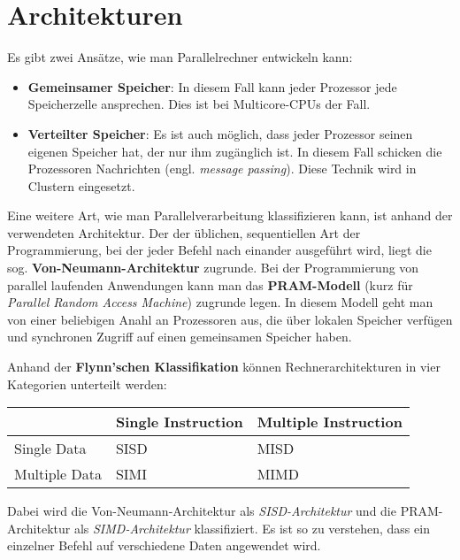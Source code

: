 \section{Architekturen}
Es gibt zwei Ansätze, wie man Parallelrechner entwickeln kann:
\begin{itemize}
    \item \textbf{Gemeinsamer Speicher}: In diesem Fall kann jeder Prozessor 
          jede Speicherzelle ansprechen. Dies ist bei Multicore-CPUs der Fall.
    \item \textbf{Verteilter Speicher}: Es ist auch möglich, dass jeder Prozessor
          seinen eigenen Speicher hat, der nur ihm zugänglich ist. In diesem Fall
          schicken die Prozessoren Nachrichten (engl. \textit{message passing}). Diese Technik wird in Clustern eingesetzt.
\end{itemize}

Eine weitere Art, wie man Parallelverarbeitung klassifizieren kann, ist anhand 
der verwendeten Architektur. Der der üblichen, sequentiellen Art der Programmierung,
bei der jeder Befehl nach einander ausgeführt wird, liegt die sog.
\textbf{Von-Neumann-Architektur} zugrunde.
Bei der Programmierung von parallel laufenden Anwendungen kann man das \textbf{PRAM-Modell} (kurz für \textit{Parallel Random Access Machine}) zugrunde legen.
In diesem Modell geht man von einer beliebigen Anahl an Prozessoren aus, die
über lokalen Speicher verfügen und synchronen Zugriff auf einen gemeinsamen
Speicher haben.

Anhand der \textbf{Flynn'schen Klassifikation}
können Rechnerarchitekturen in vier Kategorien unterteilt werden:

\begin{table}[h]
    \centering
    \begin{tabular}{l|ll}
    ~              & Single Instruction  & Multiple Instruction \\ \hline
    Single Data    & SISD                & MISD                  \\
    Multiple Data  & SIMI                & MIMD                  \\
    \end{tabular}
\end{table}

Dabei wird die Von-Neumann-Architektur als \textit{SISD-Architektur} und die
PRAM-Architektur als \textit{SIMD-Architektur} klassifiziert. Es ist so zu
verstehen, dass ein einzelner Befehl auf verschiedene Daten angewendet wird.

